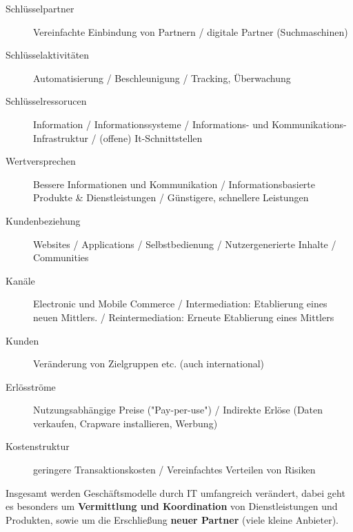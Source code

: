 \begin{description}

    \item[Schlüsselpartner]
        Vereinfachte Einbindung von Partnern / digitale Partner (Suchmaschinen)

    \item[Schlüsselaktivitäten]
        Automatisierung / Beschleunigung / Tracking, Überwachung

    \item[Schlüsselressorucen]
        Information / Informationssysteme / Informations- und Kommunikations-Infrastruktur /
        (offene) It-Schnittstellen

    \item[Wertversprechen]
        Bessere Informationen und Kommunikation / Informationsbasierte Produkte \& Dienstleistungen /
        Günstigere, schnellere Leistungen

    \item[Kundenbeziehung]
        Websites / Applications / Selbstbedienung / Nutzergenerierte Inhalte / Communities

    \item[Kanäle]
        Electronic und Mobile Commerce / Intermediation: Etablierung eines neuen Mittlers.
        / Reintermediation: Erneute Etablierung eines Mittlers

    \item[Kunden]
        Veränderung von Zielgruppen etc. (auch international)

    \item[Erlösströme]
        Nutzungsabhängige Preise ("Pay-per-use") /
        Indirekte Erlöse (Daten verkaufen, Crapware installieren, Werbung)

    \item[Kostenstruktur]
        geringere Transaktionskosten / Vereinfachtes Verteilen von Risiken

\end{description}

Insgesamt werden Geschäftsmodelle durch IT umfangreich verändert, dabei geht es
besonders um \textbf{Vermittlung und Koordination} von Dienstleistungen und Produkten,
sowie um die Erschließung \textbf{neuer Partner} (viele kleine Anbieter).
